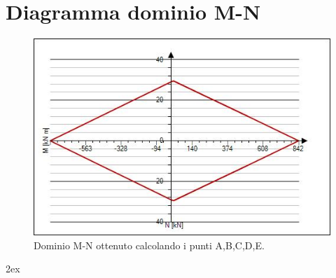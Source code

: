 \documentclass[a4paper,12pt, oneside]{book}
\begin{document}
    \section{Diagramma dominio M-N}
    
    \begin{figure}[H]
    	\centering
    	\includegraphics[width=0.7\linewidth]{"immagini/dominio mn"}
    	\caption{Dominio M-N ottenuto calcolando i punti A,B,C,D,E.}
    	\label{fig:dominio-mn}
    \end{figure}
    
    
    
    

	\newpage
	\begingroup
	\parindent 0pt
	\parskip 2ex
	\def\enotesize{\normalsize}
	\theendnotes
	\endgroup
\end{document}
